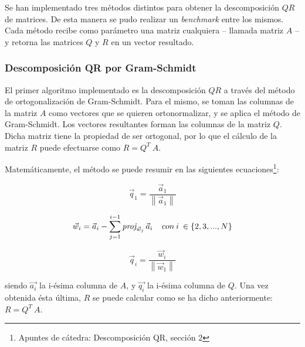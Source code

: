 \documentclass[spanish]{article}
\newcommand\norm[1]{\left\lVert#1\right\rVert}
\newcommand{\proj}[2][]{\textit{proj}_{#1} \thinspace #2}
\begin{document}
        \par Se han implementado tres métodos distintos para obtener la descomposición $QR$ de matrices. De esta manera se pudo realizar un \textit{benchmark} entre los mismos. Cada método recibe como parámetro una matriz cualquiera – llamada matriz $A$ – y retorna las matrices $Q$ y $R$ en un vector resultado.
            
        \subsubsection{Descomposición QR por Gram-Schmidt}
        
            \par El primer algoritmo implementado es la descomposición $QR$ a través del método de ortogonalización de Gram-Schmidt. Para el mismo, se toman las columnas de la matriz $A$  como vectores que se quieren ortonormalizar, y se aplica el método de Gram-Schmidt. Los vectores resultantes forman las columnas de la matriz $Q$. Dicha matriz tiene la propiedad de ser ortogonal, por lo que el cálculo de la matriz $R$ puede efectuarse como $R = Q^T\ A$.
            \par Matemáticamente, el método se puede resumir en las siguientes ecuaciones\footnote{Apuntes de cátedra: Descomposición QR, sección 2}:
            
            
            \begin{equation}
                \vec{q}_{1} = \dfrac{\vec{a}_{1}}{\norm{\vec{a}_{1}}}
            \end{equation}
            
            \begin{align}
                \vec{w}_{i} = \vec{a}_{i} - \sum_{j = 1}^{i - 1}{\proj[\vec{w}_{j}]{\vec{a}_{i}}} \;\;\;\;con\: i\: \in \{2,3, ..., N\}
            \end{align}
            
            \begin{equation}
                \vec{q}_{i} = \dfrac{\vec{w}_{i}}{\norm{\vec{w}_{1}}}
            \end{equation}
            
            siendo $\vec{a_{i}}$ la i-ésima columna de $A$, y $\vec{q_{i}}$ la i-ésima columna de $Q$. Una vez obtenida ésta última, $R$ se puede calcular como se ha dicho anteriormente: $R = Q^T\ A$.
           
            \vspace{5mm}
           
\end{document}

